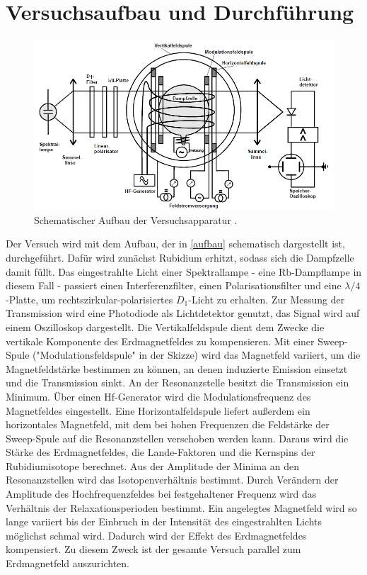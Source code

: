 \section{Versuchsaufbau und Durchführung}

\begin{figure}[h]
\centering
\includegraphics[width=\textwidth]{img/aufbau.png}
\caption{Schematischer Aufbau der Versuchsapparatur \cite{FP}.}
\label{aufbau}
\end{figure}

Der Versuch wird mit dem Aufbau, der in \autoref{aufbau} schematisch dargestellt ist, durchgeführt.
Dafür wird zunächst Rubidium erhitzt, sodass sich die Dampfzelle damit füllt. Das eingestrahlte
Licht einer Spektrallampe - eine Rb-Dampflampe in diesem Fall - passiert einen Interferenzfilter,
einen Polarisationsfilter und eine $\lambda/4$-Platte, um rechtszirkular-polarisiertes $D_1$-Licht
zu erhalten. Zur Messung der Transmission wird eine Photodiode als Lichtdetektor genutzt, das
Signal wird auf einem Oszilloskop dargestellt. Die Vertikalfeldspule dient dem Zwecke die
vertikale Komponente des Erdmagnetfeldes zu kompensieren.
Mit einer Sweep-Spule ("Modulationsfeldspule" in der Skizze) wird das Magnetfeld variiert, um die
Magnetfeldstärke bestimmen zu können, an denen induzierte Emission einsetzt und die Transmission
sinkt. An der Resonanzstelle besitzt die Transmission ein Minimum. Über einen Hf-Generator wird
die Modulationsfrequenz des Magnetfeldes eingestellt. Eine Horizontalfeldspule liefert außerdem
ein horizontales Magnetfeld, mit dem bei hohen Frequenzen die Feldstärke der Sweep-Spule auf die
Resonanzstellen verschoben werden kann. Daraus wird die Stärke des Erdmagnetfeldes, die
Lande-Faktoren und die Kernspins der Rubidiumisotope berechnet. Aus der Amplitude der Minima an
den Resonanzstellen wird das Isotopenverhältnis bestimmt. Durch Verändern der Amplitude des
Hochfrequenzfeldes bei festgehaltener Frequenz wird das Verhältnis der Relaxationsperioden
bestimmt. Ein angelegtes Magnetfeld wird so lange variiert bis der Einbruch in der Intensität
des eingestrahlten Lichts möglichst schmal wird. Dadurch wird der Effekt des Erdmagnetfeldes
kompensiert. Zu diesem Zweck ist der gesamte Versuch parallel zum Erdmagnetfeld auszurichten.

